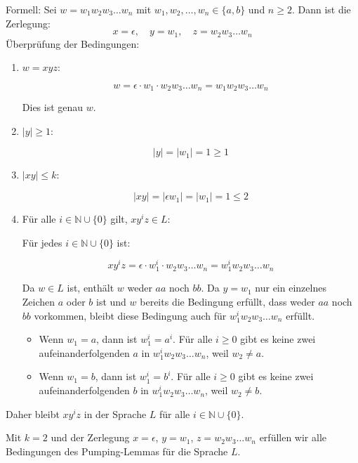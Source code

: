 \documentclass{uebungsblatt}
\begin{document}
\begin{loesung}
\begin{enumerate}
		      Formell: Sei $w = w_1w_2w_3\ldots w_n$ mit $w_1, w_2, \ldots, w_n \in \{a, b\}$ und $n \geq 2$. Dann ist die Zerlegung:
		      $$x = \epsilon, \quad y = w_1, \quad z = w_2w_3\ldots w_n$$
		      Überprüfung der Bedingungen:

		      \begin{enumerate}
			      \item $w = xyz$:

			            $$ w = \epsilon \cdot w_1 \cdot w_2w_3\ldots w_n = w_1w_2w_3\ldots w_n$$

			            Dies ist genau $w$.

			      \item $|y| \geq 1$:

			            $$ |y| = |w_1| = 1 \geq 1 $$

			      \item $|xy| \leq k$:

			            $$ |xy| = |\epsilon w_1| = |w_1| = 1 \leq 2 $$

			      \item Für alle $i \in \mathbb{N} \cup \{0\}$ gilt, $xy^i z \in L$:

			            Für jedes $i \in \mathbb{N} \cup \{0\}$ ist:

			            $$ xy^i z = \epsilon \cdot w_1^i \cdot w_2w_3\ldots w_n = w_1^i w_2w_3\ldots w_n $$

			            Da $w \in L$ ist, enthält $w$ weder $aa$ noch $bb$. Da $y = w_1$ nur ein einzelnes Zeichen $a$ oder $b$ ist und $w$ bereits die Bedingung erfüllt, dass weder $aa$ noch $bb$ vorkommen, bleibt diese Bedingung auch für $w_1^i w_2w_3\ldots w_n$ erfüllt.

			            \begin{itemize}
				            \item Wenn $w_1 = a$, dann ist $w_1^i = a^i$. Für alle $i \geq 0$ gibt es keine zwei aufeinanderfolgenden $a$ in $w_1^i w_2w_3\ldots w_n$, weil $w_2 \neq a$.
				            \item Wenn $w_1 = b$, dann ist $w_1^i = b^i$. Für alle $i \geq 0$ gibt es keine zwei aufeinanderfolgenden $b$ in $w_1^i w_2w_3\ldots w_n$, weil $w_2 \neq b$.
			            \end{itemize}
		      \end{enumerate}

		      Daher bleibt $xy^i z$ in der Sprache $L$ für alle $i \in \mathbb{N} \cup \{0\}$.

		      Mit $k = 2$ und der Zerlegung $x = \epsilon$, $y = w_1$, $z = w_2w_3\ldots w_n$ erfüllen wir alle Bedingungen des Pumping-Lemmas für die Sprache $L$.
	\end{enumerate}

\end{loesung}
\end{document}
